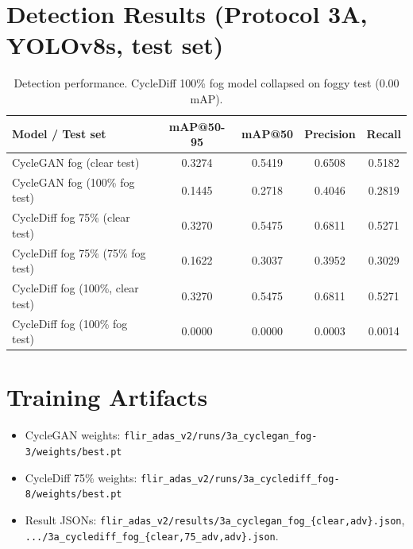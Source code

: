 \documentclass[11pt]{article}
\begin{document}
\section{Detection Results (Protocol 3A, YOLOv8s, test set)}
\begin{table}[htbp]
\centering
\begin{tabular}{lcccc}
\toprule
Model / Test set & mAP@50-95 & mAP@50 & Precision & Recall \\
\midrule
CycleGAN fog (clear test) & 0.3274 & 0.5419 & 0.6508 & 0.5182 \\
CycleGAN fog (100\% fog test) & 0.1445 & 0.2718 & 0.4046 & 0.2819 \\
CycleDiff fog 75\% (clear test) & 0.3270 & 0.5475 & 0.6811 & 0.5271 \\
CycleDiff fog 75\% (75\% fog test) & 0.1622 & 0.3037 & 0.3952 & 0.3029 \\
CycleDiff fog (100\%, clear test) & 0.3270 & 0.5475 & 0.6811 & 0.5271 \\
CycleDiff fog (100\% fog test) & 0.0000 & 0.0000 & 0.0003 & 0.0014 \\
\bottomrule
\end{tabular}
\caption{Detection performance. CycleDiff 100\% fog model collapsed on foggy test (0.00 mAP).}
\end{table}

\section{Training Artifacts}
\begin{itemize}
  \item CycleGAN weights: \texttt{flir\_adas\_v2/runs/3a\_cyclegan\_fog-3/weights/best.pt}
  \item CycleDiff 75\% weights: \texttt{flir\_adas\_v2/runs/3a\_cyclediff\_fog-8/weights/best.pt}
  \item Result JSONs: \texttt{flir\_adas\_v2/results/3a\_cyclegan\_fog\_\{clear,adv\}.json}, \texttt{.../3a\_cyclediff\_fog\_\{clear,75\_adv,adv\}.json}.
\end{itemize}
\end{document}
